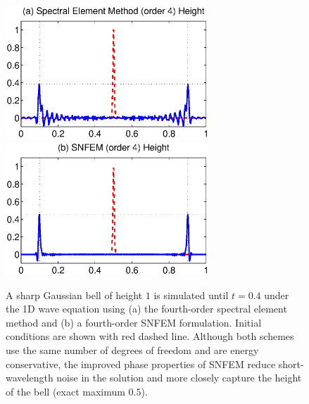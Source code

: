 \documentclass[11pt]{article}
\begin{document}
\begin{figure}
\begin{center}
\includegraphics[width=3in]{SimulatedBell_SE}
\includegraphics[width=3in]{SimulatedBell_SNFEM}
\end{center}
\caption{A sharp Gaussian bell of height $1$ is simulated until $t = 0.4$ under the 1D wave equation using (a) the fourth-order spectral element method and (b) a fourth-order SNFEM formulation.  Initial conditions are shown with red dashed line.  Although both schemes use the same number of degrees of freedom and are energy conservative, the improved phase properties of SNFEM reduce short-wavelength noise in the solution and more closely capture the height of the bell (exact maximum $0.5$).}  \label{fig:SimulatedBell}
\end{figure}





\end{document}
